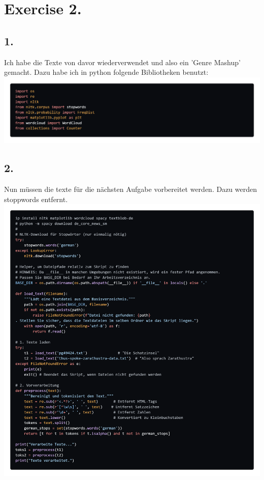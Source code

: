 \documentclass{scrartcl}
\begin{document}
\section*{Exercise 2. }
\subsection*{1.}
Ich habe die Texte von davor wiederverwendet und also ein 'Genre Mashup' gemacht. Dazu habe ich in python folgende Bibliotheken benutzt:\\
\includegraphics*[scale=0.25]{libs.png}\\
\subsection*{2.}
Nun müssen die texte für die nächsten Aufgabe vorbereitet werden. Dazu werden stoppwords entfernt.\\
\includegraphics*[scale=0.25]{cleanup.png}\\
\end{document}
